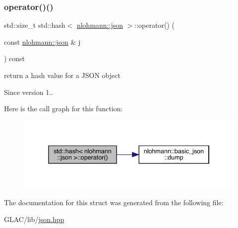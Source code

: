 \subsubsection{\texorpdfstring{operator()()}{operator()()}}
{\footnotesize\ttfamily std\+::size\+\_\+t std\+::hash$<$ \mbox{\hyperlink{namespacenlohmann_a2bfd99e845a2e5cd90aeaf1b1431f474}{nlohmann\+::json}} $>$\+::operator() (\begin{DoxyParamCaption}\item[{const \mbox{\hyperlink{namespacenlohmann_a2bfd99e845a2e5cd90aeaf1b1431f474}{nlohmann\+::json}} \&}]{j }\end{DoxyParamCaption}) const\hspace{0.3cm}{\ttfamily [inline]}}



return a hash value for a J\+S\+ON object 

\begin{DoxySince}{Since}
version 1.. 
\end{DoxySince}
Here is the call graph for this function\+:\nopagebreak
\begin{figure}[H]
\begin{center}
\leavevmode
\includegraphics[width=338pt]{structstd_1_1hash_3_01nlohmann_1_1json_01_4_aec1567d1fa47dbe5b77954dce3a55b64_cgraph}
\end{center}
\end{figure}


The documentation for this struct was generated from the following file\+:\begin{DoxyCompactItemize}
\item 
G\+L\+A\+C/lib/\mbox{\hyperlink{json_8hpp}{json.\+hpp}}\end{DoxyCompactItemize}
